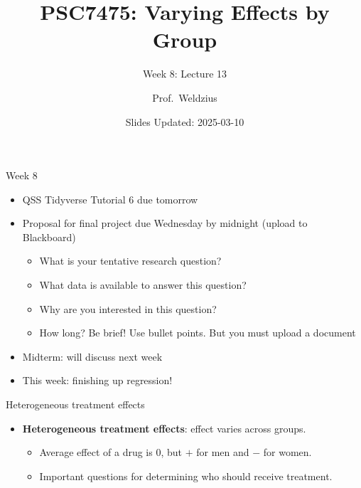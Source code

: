 \documentclass[
  ignorenonframetext,
]{beamer}
\title{PSC7475: Varying Effects by Group}
\subtitle{Week 8: Lecture 13}
\author{Prof.~Weldzius}
\date{Slides Updated: 2025-03-10}
\institute{Villanova University}
\providecommand{\tightlist}{%
  \setlength{\itemsep}{0pt}\setlength{\parskip}{0pt}}
\begin{document}
\frame{\titlepage}

\begin{frame}{Week 8}
\label{week-8}
\pause

\begin{itemize}
\tightlist
\item
  QSS Tidyverse Tutorial 6 due tomorrow \pause
\item
  Proposal for final project due Wednesday by midnight (upload to
  Blackboard) \pause

  \begin{itemize}
  \tightlist
  \item
    What is your tentative research question?
  \item
    What data is available to answer this question?
  \item
    Why are you interested in this question? \pause 
  \item
    How long? Be brief! Use bullet points. But you must upload a
    document
  \end{itemize}
\item
  Midterm: will discuss next week \pause
\item
  This week: finishing up regression!
\end{itemize}
\end{frame}

\begin{frame}{Heterogeneous treatment effects}
\label{heterogeneous-treatment-effects}
\pause

\begin{itemize}
\tightlist
\item
  \textbf{Heterogeneous treatment effects}: effect varies across
  groups.\pause

  \begin{itemize}
  \tightlist
  \item
    Average effect of a drug is 0, but \(+\) for men and \(-\) for
    women. \pause
  \item
    Important questions for determining who should receive treatment.
    \pause
  \end{itemize}
\end{itemize}
\end{frame}
\end{document}
